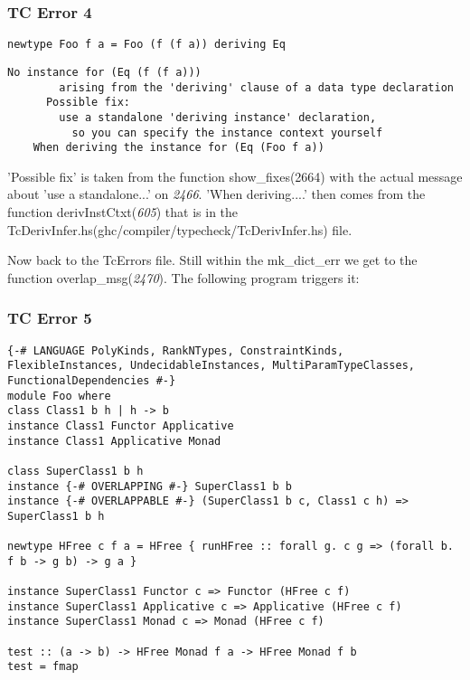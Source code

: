 \documentclass[a4paper]{article}
\begin{document}
\subsubsection{TC Error 4}

\begin{lstlisting}[label={lst: T18.0}, numbers=none, caption={Example Program \cite{ex18}}]
newtype Foo f a = Foo (f (f a)) deriving Eq
\end{lstlisting}

\begin{lstlisting}[label={lst: T18.0.2}, numbers=none, caption={Error}]
No instance for (Eq (f (f a)))
        arising from the 'deriving' clause of a data type declaration
      Possible fix:
        use a standalone 'deriving instance' declaration,
          so you can specify the instance context yourself
    When deriving the instance for (Eq (Foo f a))
\end{lstlisting}

'Possible fix' is taken from the function show\_fixes(2664) with the actual message about 'use a standalone...' on \textit{2466}. 'When deriving....' then comes from the function derivInstCtxt(\textit{605}) that is in the TcDerivInfer.hs(ghc/compiler/typecheck/TcDerivInfer.hs) file.


Now back to the TcErrors file. Still within the mk\_dict\_err we get to the function overlap\_msg(\textit{2470}). The following program triggers it:

\subsubsection{TC Error 5}

\begin{lstlisting}[label={lst: T19.0}, numbers=none, caption={Example Program \cite{ex19}}]
{-# LANGUAGE PolyKinds, RankNTypes, ConstraintKinds, FlexibleInstances, UndecidableInstances, MultiParamTypeClasses, FunctionalDependencies #-}
module Foo where
class Class1 b h | h -> b
instance Class1 Functor Applicative
instance Class1 Applicative Monad

class SuperClass1 b h
instance {-# OVERLAPPING #-} SuperClass1 b b
instance {-# OVERLAPPABLE #-} (SuperClass1 b c, Class1 c h) => SuperClass1 b h

newtype HFree c f a = HFree { runHFree :: forall g. c g => (forall b. f b -> g b) -> g a }

instance SuperClass1 Functor c => Functor (HFree c f)
instance SuperClass1 Applicative c => Applicative (HFree c f)
instance SuperClass1 Monad c => Monad (HFree c f)

test :: (a -> b) -> HFree Monad f a -> HFree Monad f b
test = fmap
\end{lstlisting}
\end{document}
